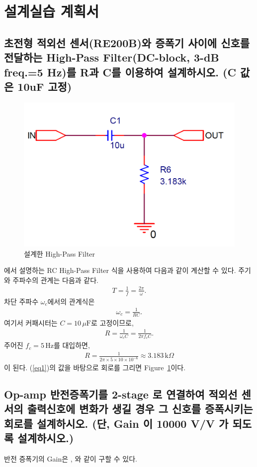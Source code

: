 \documentclass{article}
\begin{document}
\section{설계실습 계획서}
\subsection{초전형 적외선 센서(RE200B)와 증폭기 사이에 신호를 전달하는 High-Pass Filter(DC-block, 3-dB freq.=5 Hz)를 R과 C를 이용하여 설계하시오. (C 값은 10uF 고정)\label{sec1}}
\begin{figure}[H]
    \centering
    \includegraphics[width=0.5\linewidth]{figures/fig1.png}
    \caption{설계한 High-Pass Filter}
    \label{fig1}
\end{figure}
\cite{alexander2023fundamentals}에서 설명하는 RC High-Pass Filter 식을 사용하여 다음과 같이 계산할 수 있다.
주기와 주파수의 관계는 다음과 같다.
\begin{align}
    T = \frac{1}{f} = \frac{2\pi}{\omega}.
\end{align}
차단 주파수 $\omega_c$에서의 관계식은
\begin{align}
    \omega_c = \frac{1}{RC}.
\end{align}
여기서 커패시터는 $C = 10\,\mu\mathrm{F}$로 고정이므로,
\begin{align}
    R = \frac{1}{\omega_c C} = \frac{1}{2\pi f_c C}.
\end{align}
주어진 $f_c = 5\,\mathrm{Hz}$를 대입하면,
\begin{align}\label{eq1}
    R = \frac{1}{2\pi \times 5 \times 10 \times 10^{-6}}
    \approx 3.183\,\mathrm{k}\Omega
\end{align}
이 된다.
(\ref{eq1})의 값을 바탕으로 회로를 그리면 Figure~\ref{fig1}이다.


\subsection{Op-amp 반전증폭기를 2-stage 로 연결하여 적외선 센서의 출력신호에 변화가 생길 경우 그 신호를 증폭시키는 회로를 설계하시오. (단, Gain 이 10000 V/V 가 되도록 설계하시오.)\label{sec2}}
반전 증폭기의 Gain은 \cite{alexander2023fundamentals}, \cite{ele}와 같이 구할 수 있다.
\end{document}

